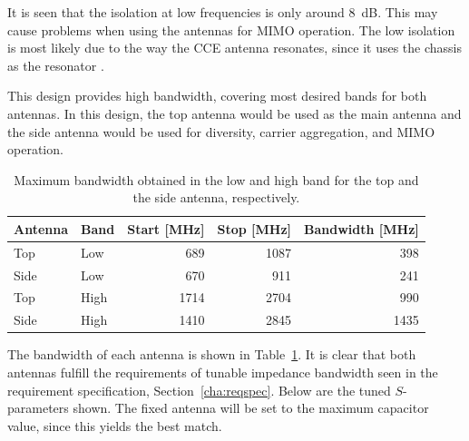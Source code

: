 It is seen that the isolation at low frequencies is only around \SI{8}{dB}. This may cause problems when using the antennas for MIMO operation. The low isolation is most likely due to the way the CCE antenna resonates, since it uses the chassis as the resonator \cite{ilvonen2014design}.

This design provides high bandwidth, covering most desired bands for both antennas. In this design, the top antenna would be used as the main antenna and the side antenna would be used for diversity, carrier aggregation, and MIMO operation. 

\begin{table}[htbp]
    \centering
    \begin{tabular}{|l|l|r|r|r|}
        \hline
        Antenna & Band & Start [MHz] & Stop [MHz] & Bandwidth [MHz] \\
        \hline
        Top     & Low  & 689         & 1087       & 398 \\
        Side    & Low  & 670         & 911        & 241 \\
        \hline
        Top     & High & 1714        & 2704       & 990 \\
        Side    & High & 1410        & 2845       & 1435 \\
        \hline
    \end{tabular}
    \caption{Maximum bandwidth obtained in the low and high band for the top and the side antenna, respectively.}
    \label{tab:bw_sol3}
\end{table}

The bandwidth of each antenna is shown in Table~\ref{tab:bw_sol3}. It is clear that both antennas fulfill the requirements of tunable impedance bandwidth seen in the requirement specification, Section~\ref{cha:reqspec}. Below are the tuned $S$-parameters shown. The fixed antenna will be set to the maximum capacitor value, since this yields the best match.  

